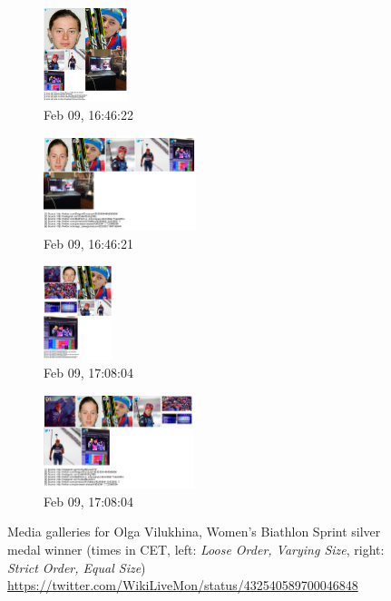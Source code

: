 \documentclass{sig-alternate-somus}
\newcommand{\inlinelistingsize}{\fontsize{8pt}{11pt}}
\let\oldurl\url
\renewcommand{\url}[1]{\inlinelistingsize\oldurl{#1}}
\begin{document}
\begin{figure}[p!]
\begin{subfigure}[t]{0.25\textwidth}
    \includegraphics[height=2.75cm]{figures/olga_vilukhina/mediagallery_looseOrder_1391960782060.png}
    \caption{Feb 09, 16:46:22}
    \label{fig:1391960782060}
  \end{subfigure}%
  \begin{subfigure}[t]{0.25\textwidth}
    \includegraphics[height=2.75cm]{figures/olga_vilukhina/mediagallery_strictOrder_1391960781898.png}
    \caption{Feb 09, 16:46:21}
    \label{fig:1391960781898}
  \end{subfigure}
  \begin{subfigure}[t]{0.25\textwidth}
    \includegraphics[height=2.75cm]{figures/olga_vilukhina/mediagallery_looseOrder_1391962084554.png}
    \caption{Feb 09, 17:08:04}
    \label{fig:1391962084554}
  \end{subfigure}%
  \begin{subfigure}[t]{0.25\textwidth}
    \includegraphics[height=2.75cm]{figures/olga_vilukhina/mediagallery_strictOrder_1391962084361.png}
    \caption{Feb 09, 17:08:04}
    \label{fig:1391962084361}
  \end{subfigure}  
  \caption{Media galleries for Olga Vilukhina,
    Women's Biathlon Sprint silver medal winner
    (times in CET, left: \emph{Loose Order, Varying Size},
    right: \emph{Strict Order, Equal Size})
    \url{https://twitter.com/WikiLiveMon/status/432540589700046848}}
  \label{fig:olga-vilukhina}
\end{figure}
\end{document}

